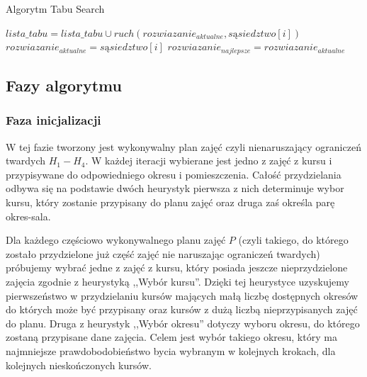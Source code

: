\begin{algorithm}[H]

    \caption{Algorytm Tabu Search}
    
    \begin{algorithmic}
    	\STATE $lista\_tabu = lista\_tabu \cup ruch(rozwiazanie_{aktualne}, sąsiedztwo[i])$
    	\STATE $rozwiazanie_{aktualne} = sąsiedztwo[i]$
    	\ENDIF
    	\STATE $rozwiazanie_{najlepsze} = rozwiazanie_{aktualne}$
    	\ENDIF
    	
    \ENDFOR
    \ENDWHILE
    \end{algorithmic}
    \label{tabusearch_pseudocode}
    \end{algorithm}

\subsection{Fazy algorytmu}
\subsubsection{Faza inicjalizacji}
\par W tej fazie tworzony jest wykonywalny plan zajęć czyli nienaruszający ograniczeń twardych ${H_{1} - H_{4}}$. W każdej iteracji wybierane jest jedno z zajęć z kursu i przypisywane do odpowiedniego okresu i pomieszczenia. Całość przydzielania odbywa się na podstawie dwóch heurystyk pierwsza z nich determinuje wybor kursu, który zostanie przypisany do planu zajęć oraz druga zaś określa parę okres-sala.
\par Dla każdego częściowo wykonywalnego planu zajęć ${P}$ (czyli takiego, do którego zostało przydzielone już część zajęć nie naruszając ograniczeń twardych) próbujemy wybrać jedne z zajęć z kursu, który posiada jeszcze nieprzydzielone zajęcia zgodnie z heurystyką ,,Wybór kursu''. Dzięki tej heurystyce uzyskujemy pierwszeństwo w przydzielaniu kursów mających małą liczbę dostępnych okresów do których może być przypisany oraz kursów z dużą liczbą nieprzypisanych zajęć do planu. Druga z heurystyk ,,Wybór okresu'' dotyczy wyboru okresu, do którego zostaną przypisane dane zajęcia. Celem jest wybór takiego okresu, który ma najmniejsze prawdobodobieństwo bycia wybranym w kolejnych krokach, dla kolejnych nieskończonych kursów.

